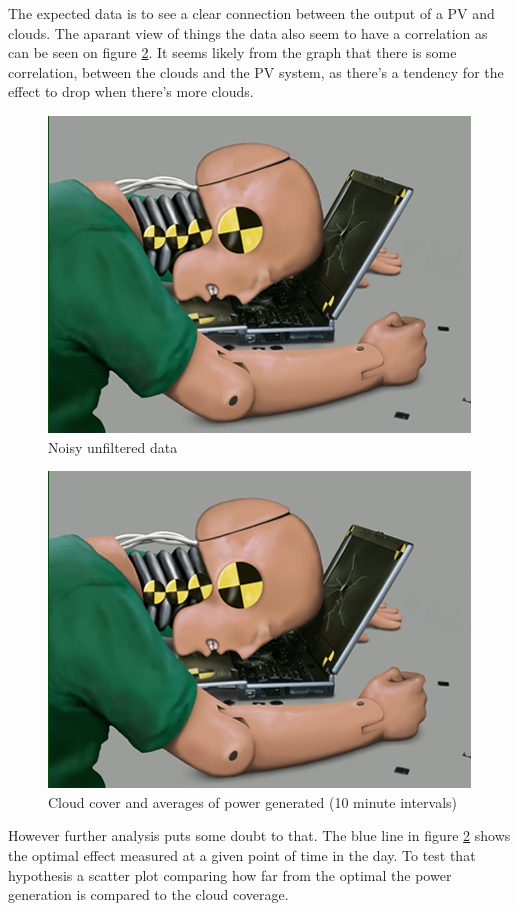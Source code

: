 The expected data is to see a clear connection between the output of a
PV and clouds\citep{southafrica}.  The aparant view of things the data
also seem to have a correlation as can be seen on figure
\ref{fig:cloudsAndPower}.  It seems likely from the graph that there
is some correlation, between the clouds and the PV system, as there's
a tendency for the effect to drop when there's more clouds.

\begin{figure}[h]
  \centering
  \includegraphics{dummy.jpg}
  \caption{Noisy unfiltered data}
  \label{fig:noise}
\end{figure}

\begin{figure}[h]
  \centering
  \includegraphics{dummy.jpg}
  \caption{Cloud cover and averages of power generated (10 minute
    intervals)}
  \label{fig:cloudsAndPower}
\end{figure}

However further analysis puts some doubt to that.  The blue line in
figure \ref{fig:cloudsAndPower} shows the optimal effect measured at a
given point of time in the day.  To test that hypothesis a scatter
plot comparing how far from the optimal the power generation is
compared to the cloud coverage.

